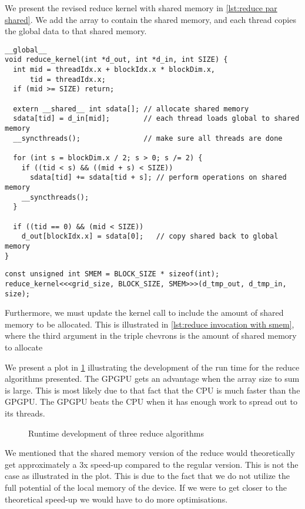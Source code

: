We present the revised reduce kernel with shared memory in \cref{lst:reduce par shared}.
We add the  array to contain the shared memory, and each thread copies the global data to that shared memory.


\begin{lstlisting}[caption={Reduce kernel using shared memory}, label={lst:reduce par shared}]
__global__
void reduce_kernel(int *d_out, int *d_in, int SIZE) {
  int mid = threadIdx.x + blockIdx.x * blockDim.x,
      tid = threadIdx.x;
  if (mid >= SIZE) return;

  extern __shared__ int sdata[]; // allocate shared memory
  sdata[tid] = d_in[mid];        // each thread loads global to shared memory
  __syncthreads();               // make sure all threads are done

  for (int s = blockDim.x / 2; s > 0; s /= 2) {
    if ((tid < s) && ((mid + s) < SIZE))
      sdata[tid] += sdata[tid + s]; // perform operations on shared memory
    __syncthreads();
  }

  if ((tid == 0) && (mid < SIZE))
    d_out[blockIdx.x] = sdata[0];   // copy shared back to global memory
}
\end{lstlisting}

\begin{lstlisting}[caption={Updated call to reduce kernel after use of shared memory}, label={lst:reduce invocation with smem}]
const unsigned int SMEM = BLOCK_SIZE * sizeof(int);
reduce_kernel<<<grid_size, BLOCK_SIZE, SMEM>>>(d_tmp_out, d_tmp_in, size);
\end{lstlisting}

Furthermore, we must update the kernel call to include the amount of shared memory to be allocated.
This is illustrated in \cref{lst:reduce invocation with smem}, where the third argument in the triple chevrons is the amount of shared memory to allocate

We present a plot in \cref{fig:reduce plot} illustrating the development of the run time for the reduce algorithms presented.
The GPGPU gets an advantage when the array size to sum is large.
This is most likely due to that fact that the CPU is much faster than the GPGPU.
The GPGPU beats the CPU when it has enough work to spread out to its threads.

\begin{figure}[htb]
  \centering
  
  \caption{Runtime development of three reduce algorithms}
  \label{fig:reduce plot}
\end{figure}

We mentioned that the shared memory version of the reduce would theoretically get approximately a 3x speed-up compared to the regular version.
This is not the case as illustrated in the plot.
This is due to the fact that we do not utilize the full potential of the local memory of the device.
If we were to get closer to the theoretical speed-up we would have to do more optimisations.
